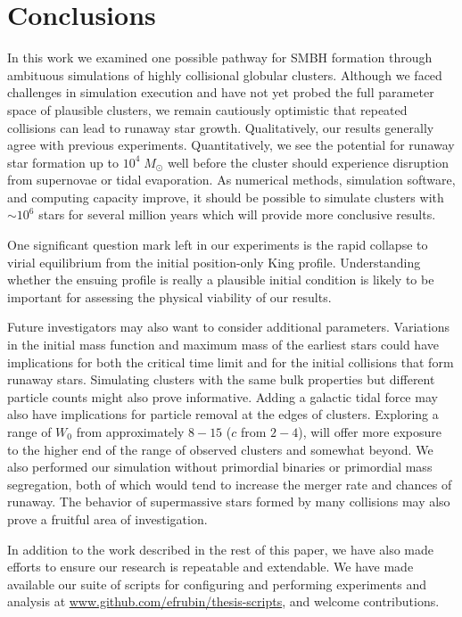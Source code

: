 \documentclass{princeton_astro_thesis}
\newcommand\Msun{\; M_\odot}
\numberwithin{equation}{section}
\begin{document}
\chapter{Conclusions} \label{ch:Conclusions}
In this work we examined one possible pathway for \ac{SMBH} formation through ambituous simulations of highly collisional globular clusters. Although we faced challenges in simulation execution and have not yet probed the full parameter space of plausible clusters, we remain cautiously optimistic that repeated collisions can lead to runaway star growth.  Qualitatively, our results generally agree with previous experiments. Quantitatively, we see the potential for runaway star formation up to $10^4 \Msun$ well before the cluster should experience disruption from supernovae or tidal evaporation. As numerical methods, simulation software, and computing capacity improve, it should be possible to simulate clusters with $\sim 10^6$ stars for several million years which will provide more conclusive results.

One significant question mark left in our experiments is the rapid collapse to virial equilibrium from the initial position-only King profile.  Understanding whether the ensuing profile is really a plausible initial condition is likely to be important for assessing the physical viability of our results.  

Future investigators may also want to consider additional parameters. Variations in the initial mass function and maximum mass of the earliest stars could have implications for both the critical time limit and for the initial collisions that form runaway stars. Simulating clusters with the same bulk properties but different particle counts might also prove informative. Adding a galactic tidal force may also have implications for particle removal at the edges of clusters. Exploring a range of $W_{0}$ from approximately $8 - 15$ ($c$ from $2 - 4$), will offer more exposure to the higher end of the range of observed clusters and somewhat beyond. We also performed our simulation without primordial binaries or primordial mass segregation, both of which would tend to increase the merger rate and chances of runaway.  The behavior of supermassive stars formed by many collisions may also prove a fruitful area of investigation.

In addition to the work described in the rest of this paper, we have also made efforts to ensure our research is repeatable and extendable. We have made available our suite of scripts for configuring and performing experiments and analysis at \url{www.github.com/efrubin/thesis-scripts}, and welcome contributions.




\nocite{*}
\end{document}
